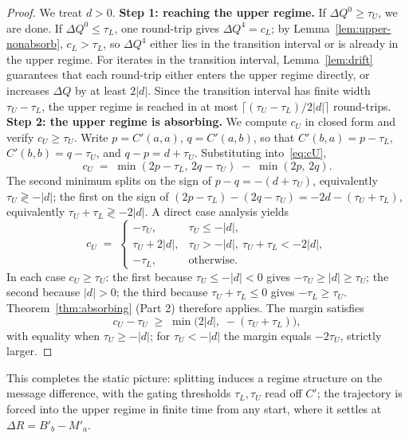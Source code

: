 \documentclass[letterpaper]{article} %
\theoremstyle{definition}
\theoremstyle{remark}
\begin{document}
\begin{proof}
We treat $d > 0$.
\textbf{Step 1: reaching the upper regime.}  If $\Delta Q^0 \geq \tau_U$, we are done.  If $\Delta Q^0 \leq \tau_L$, one round-trip gives $\Delta Q^4 = c_L$; by Lemma~\ref{lem:upper-nonabsorb}, $c_L > \tau_L$, so $\Delta Q^4$ either lies in the transition interval or is already in the upper regime.
For iterates in the transition interval, Lemma~\ref{lem:drift} guarantees that each round-trip either enters the upper regime directly, or increases $\Delta Q$ by at least $2|d|$.  Since the transition interval has finite width $\tau_U - \tau_L$, the upper regime is reached in at most $\lceil(\tau_U - \tau_L)/2|d|\rceil$ round-trips.
\textbf{Step 2: the upper regime is absorbing.}  We compute $c_U$ in closed form and verify $c_U \geq \tau_U$.  Write $p = C'(a,a)$, $q = C'(a,b)$, so that $C'(b,a) = p-\tau_L$, $C'(b,b) = q-\tau_U$, and $q-p = d+\tau_U$.  Substituting into~\eqref{eq:cU},
\[
    c_U \;=\; \min(2p-\tau_L,\, 2q-\tau_U) \;-\; \min(2p,\, 2q).
\]
The second minimum splits on the sign of $p-q = -(d+\tau_U)$, equivalently $\tau_U \gtrless -|d|$; the first on the sign of $(2p-\tau_L)-(2q-\tau_U) = -2d - (\tau_U+\tau_L)$, equivalently $\tau_U+\tau_L \gtrless -2|d|$.  A direct case analysis yields
\[
    c_U \;=\;
    \begin{cases}
        -\tau_U, & \tau_U \leq -|d|,\\[2pt]
        \tau_U + 2|d|, & \tau_U > -|d|,\ \tau_U+\tau_L < -2|d|,\\[2pt]
        -\tau_L, & \text{otherwise.}
    \end{cases}
\]
In each case $c_U \geq \tau_U$: the first because $\tau_U \leq -|d| < 0$ gives $-\tau_U \geq |d| \geq \tau_U$; the second because $|d|>0$; the third because $\tau_U+\tau_L \leq 0$ gives $-\tau_L \geq \tau_U$.  Theorem~\ref{thm:absorbing} (Part 2) therefore applies.  The margin satisfies
\[
    c_U - \tau_U \;\geq\; \min\!\bigl(2|d|,\; -(\tau_U+\tau_L)\bigr),
\]
with equality when $\tau_U \geq -|d|$; for $\tau_U < -|d|$ the margin equals $-2\tau_U$, strictly larger.  \qedhere
\end{proof}
This completes the static picture: splitting induces a regime structure on the message difference, with the gating thresholds $\tau_L, \tau_U$ read off $C'$; the trajectory is forced into the upper regime in finite time from any start, where it settles at $\Delta R = B'_b - M'_a$.
\end{document}
